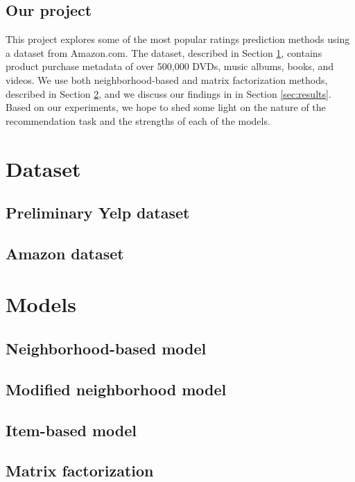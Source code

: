 \documentclass[letterpaper, 10 pt, conference]{ieeeconf}
\begin{document}
\subsection{Our project}
This project explores some of the most popular ratings prediction methods using 
a dataset from Amazon.com. The dataset, described in Section 
\ref{sec:dataset}, contains product purchase metadata of over 500,000 DVDs, 
music albums, books, and videos. We use both neighborhood-based and 
matrix factorization methods, described in Section \ref{sec:models}, and we 
discuss our findings in in Section \ref{sec:results}. Based on our 
experiments, we hope to shed some light on the nature of the recommendation 
task and the strengths of each of the models.


\section{Dataset}
\label{sec:dataset}
\subsection{Preliminary Yelp dataset}

\subsection{Amazon dataset}

\section{Models}
\label{sec:models}

\subsection{Neighborhood-based model}
\subsection{Modified neighborhood model}
\subsection{Item-based model}
\subsection{Matrix factorization}
\end{document}
